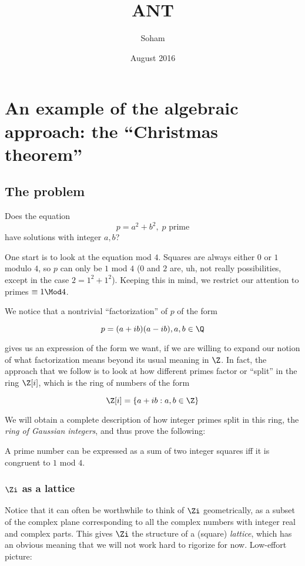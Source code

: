 \documentclass{scrbook}
\title{ANT}
\author{Soham}
\date{August 2016}
\begin{document}
\chapter{An example of the algebraic approach: the ``Christmas theorem''}

\section{The problem}
\begin{question}
Does the equation
$$p=a^2+b^2,\; p \text{ prime}$$
have solutions with integer $a, b$?
\end{question}
One start is to look at the equation mod $4$. Squares are always either $0$ or
$1$ modulo $4$, so $p$ can only be $1$ mod $4$ ($0$ and $2$ are, uh, not really
possibilities, except in the case $2 = 1^2 + 1^2$). Keeping this in mind, we
restrict our attention to primes $\equiv 1\Mod 4$.

We notice that a nontrivial ``factorization'' of $p$ of the form

$$p=(a+ib)(a-ib), a, b\in\Q$$

gives us an expression of the form we want, if we are willing to expand our
notion of what factorization means beyond its usual meaning in $\Z$.
In fact, the approach that we follow
is to look at how different primes factor or ``split'' in the ring $\Z[i]$,
which is the ring of numbers of the form

$$\Z[i] = \{a+ib : a, b\in\Z\}$$

We will obtain a complete description of how integer primes split in this ring, the
\textit{ring of Gaussian integers}, and thus prove the following:

\begin{thm}
  A prime number can be expressed as a sum of two integer squares iff it is
  congruent to $1$ mod $4$.
\end{thm}

\subsection{$\Zi$ as a lattice}

Notice that it can often be worthwhile to think of $\Zi$ geometrically, as a
subset of the complex plane corresponding to all the complex numbers with
integer real and complex parts. This gives $\Zi$ the structure of a (square)
\textit{lattice}, which has an obvious meaning that we will not work hard to
rigorize for now. Low-effort picture:
\end{document}
